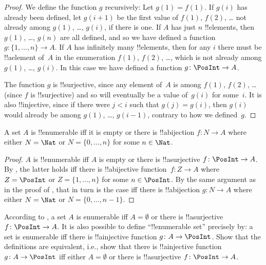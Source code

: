\documentclass[../../../include/open-logic-section]{subfiles}
\begin{document}
\begin{proof}
  We define the function $g$ recursively: Let $g(1) = f(1)$. If $g(i)$
  has already been defined, let $g(i+1)$ be the first value of $f(1)$,
  $f(2)$, \dots{} not already among $g(1)$, \dots, $g(i)$, if there is
  one. If $A$ has just $n$ !!{element}s, then $g(1)$, \dots, $g(n)$ are all
  defined, and so we have defined a function $g\colon \{1, \dots, n\}
  \to A$. If $A$ has infinitely many !!{element}s, then for any $i$
  there must be !!a{element} of~$A$ in the enumeration $f(1)$, $f(2)$,
  \dots, which is not already among $g(1)$, \dots, $g(i)$. In this
  case we have defined a function $g\colon \PosInt \to A$.
  
  The function $g$ is !!{surjective}, since any element of~$A$ is
  among $f(1)$, $f(2)$, \dots{} (since $f$ is !!{surjective}) and so
  will eventually be a value of~$g(i)$ for some~$i$. It is also
  !!{injective}, since if there were $j < i$ such that $g(j) = g(i)$,
  then $g(i)$ would already be among $g(1)$, \dots, $g(i-1)$, contrary
  to how we defined~$g$.
\end{proof}

\begin{cor}
A set $A$ is !!{enumerable} iff it is empty or there is !!a{bijection}
$f\colon N \to A$ where either $N = \Nat$ or $N = \{0, \dots, n\}$ for
some $n \in \Nat$.
\end{cor}

\begin{proof}
$A$ is !!{enumerable} iff $A$ is empty or there is !!a{surjective}
$f\colon \PosInt \to A$. By , the latter holds
iff there is !!a{bijective} function~$f\colon Z \to A$ where $Z =
\PosInt$ or $Z = \{1, \dots, n\}$ for some $n \in \PosInt$. By the
same argument as in the proof of , that in turn
is the case iff there is !!a{bijection} $g\colon N \to A$ where either
$N = \Nat$ or $N = \{0, \dots, n-1\}$.
\end{proof}

\begin{prob}
  According to , a set $A$ is
  enumerable iff $A = \emptyset$ or there is !!a{surjective} $f\colon
  \PosInt \to A$.  It is also possible to define ``!!{enumerable} set''
  precisely by: a set is enumerable iff there is !!a{injective}
  function $g\colon A \to \PosInt$.  Show that the definitions are
  equivalent, i.e., show that there is !!a{injective} function
  $g\colon A \to \PosInt$ iff either $A = \emptyset$ or there is
  !!a{surjective} $f\colon \PosInt \to A$.
\end{prob}
\end{document}
